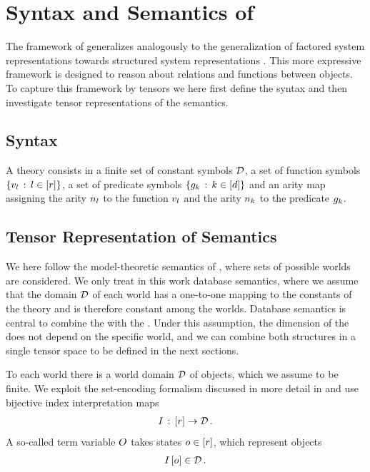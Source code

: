 
\section{Syntax and Semantics of \firstOrderLogic{}}

The framework of \firstOrderLogic{} generalizes \propositionalLogic{} analogously to the generalization of factored system representations towards structured system representations \cite{russell_artificial_2021}.
This more expressive framework is designed to reason about relations and functions between objects.
To capture this framework by tensors we here first define the syntax and then investigate tensor representations of the semantics.

\subsection{Syntax}

A \firstOrderLogic{} theory consists in a finite set of constant symbols $\mathcal{D}$, a set of function symbols $\{v_{l}\,:\,l\in[r]\}$, a set of predicate symbols $\{g_{k}\,:\,k\in[d]\}$ and an arity map assigning the arity $n_{l}$ to the function $v_{l}$ and the arity $n_{k}$ to the predicate $g_{k}$.

\subsection{Tensor Representation of Semantics}

We here follow the model-theoretic semantics of \firstOrderLogic{}, where sets of possible worlds are considered.
We only treat in this work database semantics, where we assume that the domain $\mathcal{D}$ of each world has a one-to-one mapping to the constants of the theory and is therefore constant among the worlds.
Database semantics is central to combine the \semanticStructure{} with the \substitutionStructure{}.
Under this assumption, the dimension of the \substitutionStructure{} does not depend on the specific world, and we can combine both structures in a single tensor space to be defined in the next sections.

To each world there is a world domain $\mathcal{D}$ of objects, which we assume to be finite.
We exploit the set-encoding formalism discussed in more detail in  and use bijective index interpretation maps
\begin{align*}
    I \,:\, [r] \rightarrow \mathcal{D} \, .
\end{align*}
A so-called term variable $O$ takes states $o\in[r]$, which represent objects
\begin{align*}
    I\left[o\right] \in \mathcal{D} \, .
\end{align*}

